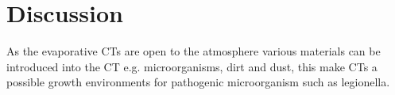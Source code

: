 \chapter{Discussion}


As the evaporative CTs are open to the atmosphere various  materials can be introduced into the CT e.g. microorganisms, dirt and dust, this make CTs a possible growth environments for pathogenic microorganism such as legionella.  \citep{IntroductionCoolingTower2014} %